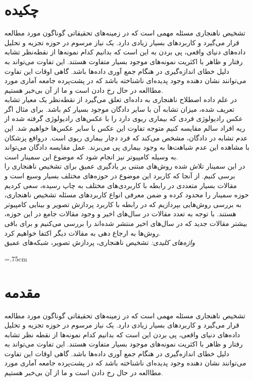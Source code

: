 \documentclass[12pt,a4paper]{report}
\newcommand*{\BeginNoToc}{%
  \addtocontents{toc}{%
    \edef\protect\SavedTocDepth{\protect\the\protect\value{tocdepth}}%
  }%
  \addtocontents{toc}{%
    \protect\setcounter{tocdepth}{-10}%
  }%
}
\newcommand*{\EndNoToc}{%
  \addtocontents{toc}{%
    \protect\setcounter{tocdepth}{\protect\SavedTocDepth}%
  }%
}
\theoremstyle{definition}
\theoremstyle{definition}
\begin{document}
	\chapter*{چکیده}
	تشخیص ناهنجاری‌ مسئله مهمی است که در زمینه‌های تحقیقاتی گوناگون مورد مطالعه قرار می‌گیرد و کاربرد‌های بسیار زیادی دارد. یک نیاز مرسوم در حوزه تجزیه و تحلیل داده‌های دنیای واقعی، پی بردن به این است که بدانیم کدام نمونه‌ها از نقطه‌نظر تشابه رفتار و ظاهر با اکثریت نمونه‌های موجود بسیار متفاوت هستند. این تفاوت می‌تواند به دلیل خطای انداز‌ه‌گیری در هنگام جمع آوری داده‌ها باشد. گاهی اوقات این تفاوت می‌توانند نشان‌ دهنده وجود پدیده‌ای ناشناخته‌ باشد که در پشت‌پرده جامعه آماری مورد مطاالعه در حال رخ دادن است و ما از آن بی‌خبر هستیم. \\

در علم داده اصطلاح ناهنجاری به داده‌ای تعلق می‌گیرد از نقطه‌نظر یک معیار تشابه تعریف شده، میزان تشابه آن با سایر دادگان موجود بسیار کم باشد. برای مثال اگر عکس رادیولوژی فردی که بیماری ریوی دارد را با عکس‌های رادیولوژی گرفته شده از ریه افراد سالم مقایسه کنیم متوجه تفاوت این عکس با سایر عکس‌ها خواهیم شد. این عدم تشابه در دادگان، مشخص می‌کند  که فرد دچار بیماری ریوی است. درواقع پزشکان با مشاهده این عدم شباهت‌ها به وجود بیماری پی می‌برند. عمل مقایسه دادگان می‌تواند به وسیله کامپیوتر نیز انجام شود که موضوع این سمینار است.\\

در این سمینار تلاش شده روش‌های مبتنی بر یادگیری عمیق برای تشخیص ناهنجاری را برسی کنیم. از آنجا که کاربرد این موضوع در حوزه‌های مختلف بسیار وسیع است و مقالات بسیار متعددی در رابطه با کاربردی‌های مختلف به چاپ رسیده، سعی کردیم حوزه سمینار را محدود کرده و ضمن معرفی انواع کاربرد‌های مسئله تشخیص ناهنجاری، به بررسی روش‌هایی بپردازیم که در رابطه با کاربرد پردازش تصویر و بینایی کامپیوتر هستند. با توجه به تعدد مقالات در سال‌های اخیر و وجود مقالات جامع در این حوزه، بیشتر مقالات جدید که در سال‌های اخیر منتشر شده‌اند را بررسی می‌کنیم و برای باقی روش‌ها به ارجاع دهی به مقالات دیگر اکتفا خواهیم کرد.\\

	\textit{
واژه‌های کلیدی:
	}
	تشخیص ناهنجاری، پردازش تصویر، شبکه‌های عمیق
	\newpage
	\baselineskip=1cm
	\BeginNoToc
	\tableofcontents
	\listoffigures
	\listoftables
	\EndNoToc
	\newpage
	\baselineskip=.75cm

\chapter{مقدمه}
	تشخیص ناهنجاری‌ مسئله مهمی است که در زمینه‌های تحقیقاتی گوناگون مورد مطالعه قرار می‌گیرد و کاربرد‌های بسیار زیادی دارد. یک نیاز مرسوم در حوزه تجزیه و تحلیل داده‌های دنیای واقعی، پی بردن این است که بدانیم کدام نمونه‌ها از نقطه نظر تشابه رفتار و ظاهر با اکثریت نمونه‌های موجود بسیار متفاوت هستند. این تفاوت می‌تواند به دلیل خطای انداز‌ه‌گیری در هنگام جمع آوری داده‌ها باشد. گاهی اوقات این تفاوت می‌توانند نشان‌ دهنده وجود پدیده‌ای ناشناخته‌ باشد که در پشت‌پرده جامعه آماری مورد مطاالعه در حال رخ دادن است و ما از آن بی‌خبر هستیم. 
	
\end{document}
